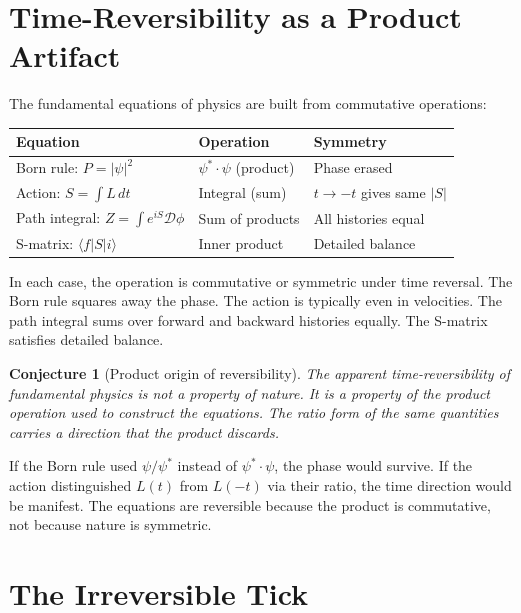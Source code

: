 \documentclass[12pt,reqno]{amsart}
\newtheorem{conjecture}[theorem]{Conjecture}
\theoremstyle{definition}
\theoremstyle{remark}
\newcommand{\abs}[1]{\lvert #1 \rvert}
\begin{document}
\section{Time-Reversibility as a Product Artifact}

The fundamental equations of physics are built from commutative operations:
\begin{center}
\begin{tabular}{@{}lll@{}}
\toprule
Equation & Operation & Symmetry \\
\midrule
Born rule: $P = \abs{\psi}^2$ & $\psi^*\!\cdot\psi$ (product) & Phase erased \\
Action: $S = \int L\,dt$ & Integral (sum) & $t \to -t$ gives same $\abs{S}$ \\
Path integral: $Z = \int e^{iS}\mathcal{D}\phi$ & Sum of products & All histories equal \\
S-matrix: $\langle f\vert S\vert i\rangle$ & Inner product & Detailed balance \\
\bottomrule
\end{tabular}
\end{center}

In each case, the operation is commutative or symmetric under time reversal. The Born rule squares away the phase. The action is typically even in velocities. The path integral sums over forward and backward histories equally. The S-matrix satisfies detailed balance.

\begin{conjecture}[Product origin of reversibility]\label{conj:reversibility}
The apparent time-reversibility of fundamental physics is not a property of nature. It is a property of the product operation used to construct the equations. The ratio form of the same quantities carries a direction that the product discards.
\end{conjecture}

If the Born rule used $\psi/\psi^*$ instead of $\psi^*\!\cdot\psi$, the phase would survive. If the action distinguished $L(t)$ from $L(-t)$ via their ratio, the time direction would be manifest. The equations are reversible because the product is commutative, not because nature is symmetric.

\section{The Irreversible Tick}
\end{document}
